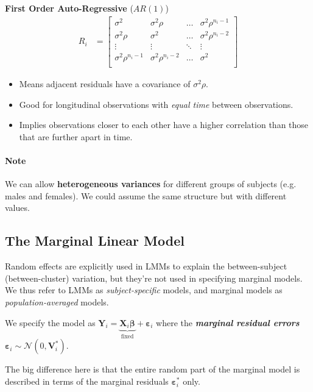 \documentclass[english]{article}
\begin{document}
\begin{multicols*}{2}
\textbf{First Order Auto-Regressive} ($AR(1)$)
\begin{align*}
	R_{i}
	&=	\begin{bmatrix}
		\sigma^{2}	&	\sigma^{2}\rho	&	\dots	&	\sigma^{2}\rho^{n_{i}-1}	\\
		\sigma^{2}\rho	&	\sigma^{2}	&	\dots	&	\sigma^{2}\rho^{n_{i}-2}	\\
		\vdots	&	\vdots	&	\ddots	&	\vdots	\\
		\sigma^{2}\rho^{n_{i}-1}	&	\sigma^{2}\rho^{n_{i}-2}	&	\dots	&	\sigma^{2}	\\
		\end{bmatrix}
\end{align*}
\begin{itemize}
	\item	Means adjacent residuals have a covariance of $\sigma^{2}\rho$.
	\item	Good for longitudinal observations with \textit{equal time} between observations.
	\item	Implies observations closer to each other have a higher correlation than those that are further apart in time.
\end{itemize}

\paragraph{Note}	We can allow \textbf{heterogeneous variances} for different groups of subjects (e.g. males and females). We could assume the same structure but with different values.


\subsection{The Marginal Linear Model}
\begin{rappel_enhanced}[Context]
Random effects are explicitly used in LMMs to explain the between-subject (between-cluster) variation, but they're not used in specifying marginal models. We thus refer to LMMs as \textit{subject-specific} models, and marginal models as \textit{population-averaged} models.
\end{rappel_enhanced}

We specify the model as $\bm{Y}_{i} = \underbrace{\bm{X}_{i}\bm{\beta}}_{\text{fixed}} + \bm{\varepsilon}_{i}$ where the \textbf{\textit{marginal residual errors}} $\bm{\varepsilon}_{i} \sim \mathcal{N}(0, \bm{V}^{*}_{i})$. 

\bigskip

The big difference here is that the entire random part of the marginal model is described in terms of the marginal residuals $\bm{\varepsilon}_{i}^{*}$ only.


\end{multicols*}
\end{document}
